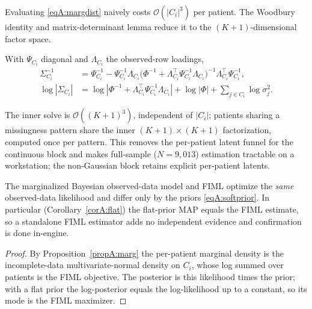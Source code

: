 Evaluating \eqref{eqA:margdist} naively costs $\mathcal{O}(|C_i|^3)$ per patient. The
Woodbury identity and matrix-determinant lemma reduce it to the $(K{+}1)$-dimensional
factor space.
\begin{lemma}\label{lemA:woodbury}
With $\Psi_{C_i}$ diagonal and $\Lambda_{C_i}$ the observed-row loadings,
\begin{align}
  \Sigma_{C_i}^{-1} &= \Psi_{C_i}^{-1}-\Psi_{C_i}^{-1}\Lambda_{C_i}
      \bigl(\Phi^{-1}+\Lambda_{C_i}^{\top}\Psi_{C_i}^{-1}\Lambda_{C_i}\bigr)^{-1}
      \Lambda_{C_i}^{\top}\Psi_{C_i}^{-1}, \label{eqA:woodbury}\\[2pt]
  \log\!\left|\Sigma_{C_i}\right| &= \log\!\left|\Phi^{-1}+\Lambda_{C_i}^{\top}\Psi_{C_i}^{-1}\Lambda_{C_i}\right|
      +\log|\Phi|+\!\!\sum_{j\in C_i}\!\log\sigma_j^2 .
\end{align}
\end{lemma}
The inner solve is $\mathcal{O}\!\left((K{+}1)^3\right)$, independent of $|C_i|$;
patients sharing a missingness pattern share the inner $(K{+}1)\times(K{+}1)$
factorization, computed once per pattern. This removes the per-patient latent funnel
for the continuous block and makes full-sample ($N=9{,}013$) estimation tractable on a
workstation; the non-Gaussian block retains explicit per-patient latents.

\begin{proposition}\label{propA:fiml}
The marginalized Bayesian observed-data model and FIML optimize the \emph{same}
observed-data likelihood and differ only by the priors \eqref{eqA:softprior}. In
particular (Corollary~\ref{corA:flat}) the flat-prior MAP equals the FIML estimate, so
a standalone FIML estimator adds no independent evidence and confirmation is done
in-engine.
\end{proposition}
\begin{proof}
By Proposition~\ref{propA:marg} the per-patient marginal density is the
incomplete-data multivariate-normal density on $C_i$, whose log summed over patients is
the FIML objective. The posterior is this likelihood times the prior; with a flat prior
the log-posterior equals the log-likelihood up to a constant, so its mode is the FIML
maximizer.
\end{proof}

